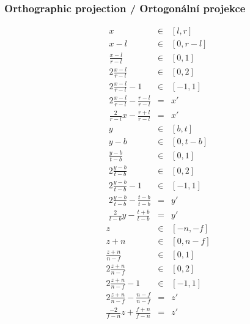 \begin{frame}
\frametitle{Orthographic projection / Ortogonální projekce}
\begin{multicols}{3}
{\tiny
\begin{eqnarray*}
	x &\in& [l,r] \\
	x-l &\in& [0,r-l] \\
	\frac{x-l}{r-l} &\in& [0,1] \\
	2 \frac{x-l}{r-l} &\in& [0,2] \\
	2 \frac{x-l}{r-l}-1 &\in& [-1,1]\\
	2 \frac{x-l}{r-l}- \frac{r-l}{r-l} &=& x'\\
	\frac{2}{r-l}x - \frac{r+l}{r-l} &=& x'
\end{eqnarray*}
}
\vfill
{\tiny
\begin{eqnarray*}
	y &\in& [b,t] \\
	y-b &\in& [0,t-b] \\
	\frac{y-b}{t-b} &\in& [0,1] \\
	2 \frac{y-b}{t-b} &\in& [0,2] \\
	2 \frac{y-b}{t-b}-1 &\in& [-1,1]\\
	2 \frac{y-b}{t-b}- \frac{t-b}{t-b} &=& y'\\
	\frac{2}{t-b}y - \frac{t+b}{t-b} &=& y'
\end{eqnarray*}
}
\vfill
{\tiny
\begin{eqnarray*}
	z &\in& [-n,-f] \\
	z+n &\in& [0,n-f] \\
	\frac{z+n}{n-f} &\in& [0,1] \\
	2 \frac{z+n}{n-f} &\in& [0,2] \\
	2 \frac{z+n}{n-f}-1 &\in& [-1,1]\\
	2 \frac{z+n}{n-f}- \frac{n-f}{n-f} &=& z'\\
	\frac{-2}{f-n}z + \frac{f+n}{f-n} &=& z'
\end{eqnarray*}
}
\end{multicols}

\end{frame}

